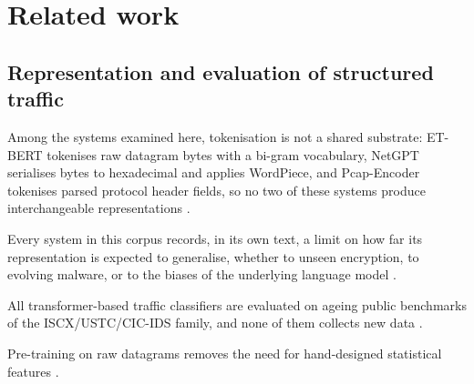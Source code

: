 \documentclass{article}
\begin{document}
\section{Related work}
\subsection{Representation and evaluation of structured traffic}

Among the systems examined here, tokenisation is not a shared substrate: ET-BERT tokenises raw datagram bytes with a bi-gram vocabulary, NetGPT serialises bytes to hexadecimal and applies WordPiece, and Pcap-Encoder tokenises parsed protocol header fields, so no two of these systems produce interchangeable representations \cite{lin2022etbert,meng2023netgpt,sugar2025debunking}.

Every system in this corpus records, in its own text, a limit on how far its representation is expected to generalise, whether to unseen encryption, to evolving malware, or to the biases of the underlying language model \cite{lin2022etbert,meng2023netgpt,rapier2024lowquality,llmnids2025survey}.

All transformer-based traffic classifiers are evaluated on ageing public benchmarks of the ISCX/USTC/CIC-IDS family, and none of them collects new data \cite{lin2022etbert,meng2023netgpt}.

Pre-training on raw datagrams removes the need for hand-designed statistical features \cite{rapier2024lowquality}.



\end{document}
